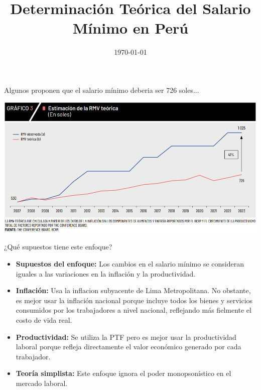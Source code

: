 \documentclass{beamer}
\title{Determinación Teórica del Salario Mínimo en Perú}
\author{}
\institute{}
\date{\today}
\begin{document}
\begin{frame}
    \titlepage
\end{frame}

\begin{frame}{Algunos proponen que el salario mínimo deberia ser 726 soles...}
    \begin{center}
        \includegraphics[width=\linewidth]{bcrp_salmin.PNG}
    \end{center}
\end{frame}


\begin{frame}{¿Qué supuestos tiene este enfoque?}
    \begin{itemize}
        \item \textbf{Supuestos del enfoque:} Los cambios en el salario mínimo se consideran iguales a las variaciones en la inflación y la productividad.
        \item \textbf{Inflación:} Usa la inflacion subyacente de Lima Metropolitana. No obstante, es mejor usar la inflación nacional porque incluye todos los bienes y servicios consumidos por los trabajadores a nivel nacional, reflejando más fielmente el costo de vida real.
        \item \textbf{Productividad:} Se utiliza la PTF pero es mejor usar la productividad laboral porque refleja directamente el valor económico generado por cada trabajador.
        \item \textbf{Teoría simplista:} Este enfoque ignora el poder monopsonístico en el mercado laboral.
    \end{itemize}
\end{frame}
\end{document}
